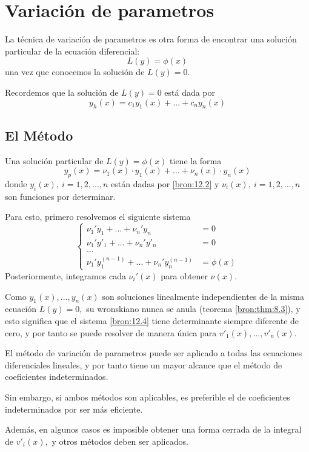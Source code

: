  \section{Variaci\'on de parametros}


La t\'ecnica de variaci\'on de parametros es otra forma de encontrar una soluci\'on particular de la ecuaci\'on diferencial:
\[
	\label{bron:12.1}
	L(y)=\phi(x)
\]
una vez que conocemos la soluci\'on de $L(y)=0.$



Recordemos que la soluci\'on de $L(y)=0$ está dada por
\[
	\label{bron:12.2}
	y_{h}(x)=c_{1}y_{1}(x)+...+c_{n}y_{n}(x)
\]



\subsection{El M\'etodo}


Una soluci\'on particular de $L(y)=\phi(x)$ tiene la forma
\[
	\label{bron:12.3}
	y_{p}(x)=\nu_{1}(x)\cdot y_{1}(x)+...+\nu_{n}(x) \cdot y_{n}(x)
\]
donde $y_{i}(x), \ i=1,2,...,n$ están dadas por \eqref{bron:12.2} y $\nu_{i}(x), \ i=1,2,...,n$ son funciones por determinar.



Para esto, primero resolvemos el siguiente sistema
\[
	\label{bron:12.4}
	\begin{cases}
		\nu_{1}'y_{1}+...+\nu_{n}'y_{n}&=0\\
		\nu_{1}'y'_{1}+...+\nu_{n}'y'_{n}&=0\\
		\ldots & \\
		\nu_{1}'y^{(n-1)}_{1}+...+\nu_{n}'y^{(n-1)}_{n}&=\phi(x)
	\end{cases}
\]
Posteriormente, integramos cada $\nu_{i}'(x)$ para obtener $\nu(x).$



Como $y_{1}(x),...,y_{n}(x)$ son soluciones linealmente independientes de la misma ecuaci\'on $L(y)=0,$ su wronskiano nunca se anula (teorema \ref{bron:thm:8.3}), y esto significa que el sistema \eqref{bron:12.4} tiene determinante siempre diferente de cero, y por tanto se puede resolver de manera única para $v'_{1}(x),...,v'_{n}(x).$



\begin{observacion}
	El m\'etodo de variaci\'on de parametros puede ser aplicado a todas las ecuaciones diferenciales lineales, y por tanto tiene un mayor alcance que el m\'etodo de coeficientes indeterminados.

	Sin embargo, si ambos m\'etodos son aplicables, es preferible el de coeficientes indeterminados por ser más eficiente.

	Además, en algunos casos es imposible obtener una forma cerrada de la integral de $v'_{i}(x),$ y otros m\'etodos deben ser aplicados.
\end{observacion}



